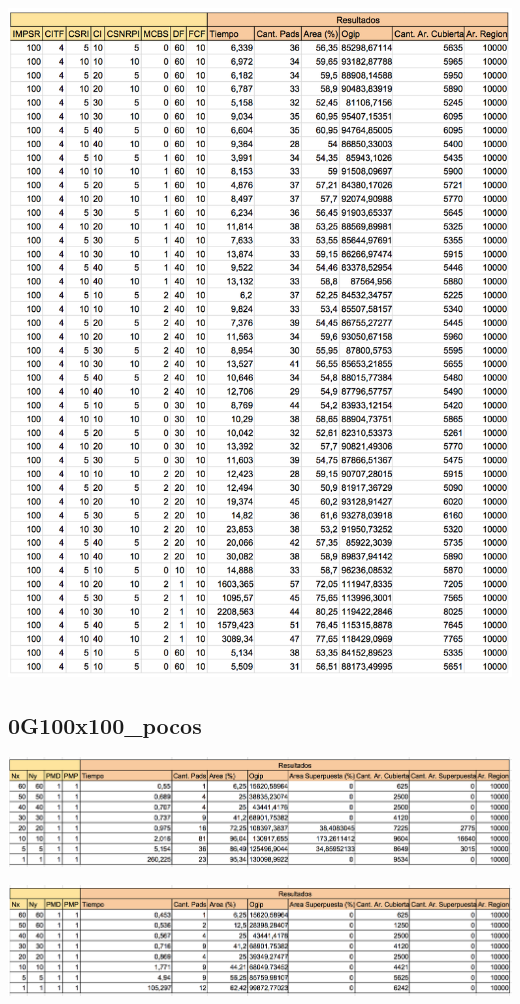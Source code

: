 \begin{center}
\includegraphics[width=1\textwidth]{imagenes/0G100x100_muchos_V2}
\end{center}

\subsection{0G100x100\_pocos}

\begin{center}
\includegraphics[width=1\textwidth]{imagenes/S_0G100x100_pocos}
\end{center}

\begin{center}
\includegraphics[width=1\textwidth]{imagenes/G_0G100x100_pocos}
\end{center}

